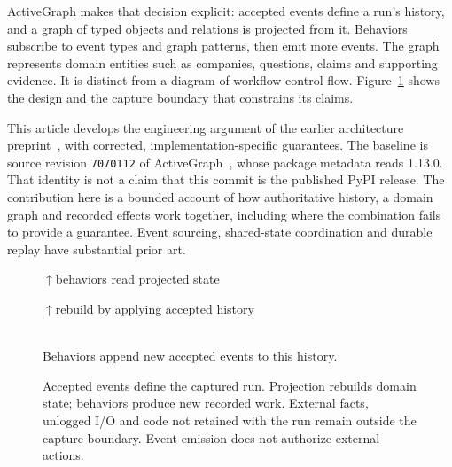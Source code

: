 \documentclass[11pt]{article}
\begin{document}
ActiveGraph makes that decision explicit: accepted events define a run's history, and a graph of typed objects and relations is projected from it. Behaviors subscribe to event types and graph patterns, then emit more events. The graph represents domain entities such as companies, questions, claims and supporting evidence. It is distinct from a diagram of workflow control flow. Figure~\ref{fig:architecture} shows the design and the capture boundary that constrains its claims.

This article develops the engineering argument of the earlier architecture preprint~\cite{preprint}, with corrected, implementation-specific guarantees. The baseline is source revision \texttt{7070112} of ActiveGraph~\cite{source}, whose package metadata reads 1.13.0. That identity is not a claim that this commit is the published PyPI release. The contribution here is a bounded account of how authoritative history, a domain graph and recorded effects work together, including where the combination fails to provide a guarantee. Event sourcing, shared-state coordination and durable replay have substantial prior art.

\begin{figure}[t]
\centering\small
\setlength{\fboxsep}{5pt}

\(\uparrow\)\quad behaviors read projected state


\(\uparrow\)\quad rebuild by applying accepted history

\\[3pt]
{\small Behaviors append new accepted events to this history.}

\caption{Accepted events define the captured run. Projection rebuilds domain state; behaviors produce new recorded work. External facts, unlogged I/O and code not retained with the run remain outside the capture boundary. Event emission does not authorize external actions.}
\label{fig:architecture}
\end{figure}
\end{document}
